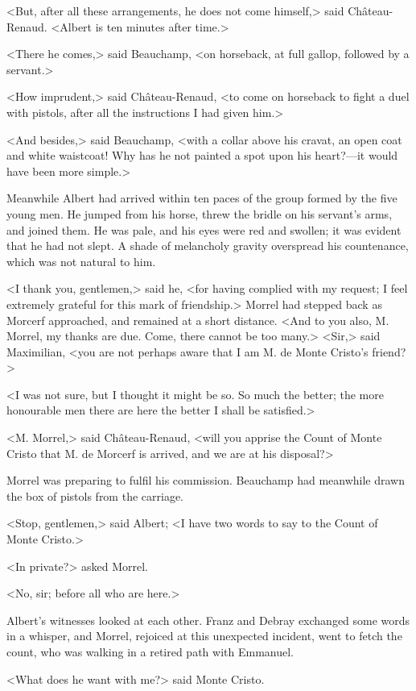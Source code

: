  <But, after all these arrangements, he does not come himself,> said Château-Renaud. <Albert is ten minutes after time.> 

 <There he comes,> said Beauchamp, <on horseback, at full gallop, followed by a servant.> 

 <How imprudent,> said Château-Renaud, <to come on horseback to fight a duel with pistols, after all the instructions I had given him.> 

 <And besides,> said Beauchamp, <with a collar above his cravat, an open coat and white waistcoat! Why has he not painted a spot upon his heart?—it would have been more simple.> 

 Meanwhile Albert had arrived within ten paces of the group formed by the five young men. He jumped from his horse, threw the bridle on his servant's arms, and joined them. He was pale, and his eyes were red and swollen; it was evident that he had not slept. A shade of melancholy gravity overspread his countenance, which was not natural to him. 

 <I thank you, gentlemen,> said he, <for having complied with my request; I feel extremely grateful for this mark of friendship.> Morrel had stepped back as Morcerf approached, and remained at a short distance. <And to you also, M. Morrel, my thanks are due. Come, there cannot be too many.>  <Sir,> said Maximilian, <you are not perhaps aware that I am M. de Monte Cristo's friend?> 

 <I was not sure, but I thought it might be so. So much the better; the more honourable men there are here the better I shall be satisfied.> 

 <M. Morrel,> said Château-Renaud, <will you apprise the Count of Monte Cristo that M. de Morcerf is arrived, and we are at his disposal?> 

 Morrel was preparing to fulfil his commission. Beauchamp had meanwhile drawn the box of pistols from the carriage. 

 <Stop, gentlemen,> said Albert; <I have two words to say to the Count of Monte Cristo.> 

 <In private?> asked Morrel. 

 <No, sir; before all who are here.> 

 Albert's witnesses looked at each other. Franz and Debray exchanged some words in a whisper, and Morrel, rejoiced at this unexpected incident, went to fetch the count, who was walking in a retired path with Emmanuel. 

 <What does he want with me?> said Monte Cristo. 

